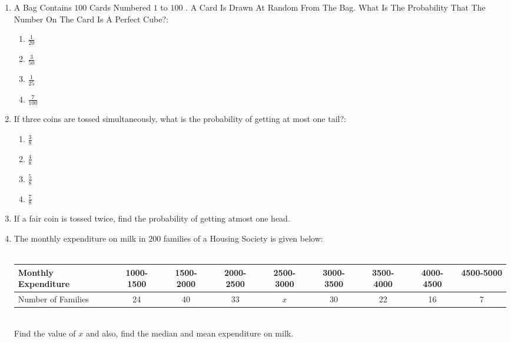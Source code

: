 \begin{enumerate}
\item A Bag Contains $100$ Cards Numbered $1$ to $100$ . A Card Is Drawn At Random From The Bag. What Is The Probability That The Number On The Card Is A Perfect Cube?:    
    \begin{enumerate}
    \item $ \frac{1}{20} $              
    \item $ \frac{3}{50} $                    
    \item $ \frac{1}{25} $                                                
    \item $ \frac{7}{100} $
    \end{enumerate}
    \newpage
    \item If three coins are tossed simultaneously, what is the probability of getting at most one tail?:
    \begin{enumerate}
    \item $ \frac{3}{8} $                              
    \item $ \frac{4}{8} $                            
    \item $ \frac{5}{8} $  
    \item $ \frac{7}{8} $    
    \end{enumerate}
\item
If a fair coin is tossed twice, find the probability of getting atmost one head.

\item
The monthly expenditure on milk in $200$ families of a Housing Society is given below:\\
\\
\footnotesize
\setlength{\tabcolsep}{1pt}
\begin{tabular}{|l|c|c|c|c|c|c|c|c|}
\hline
	Monthly Expenditure \brak{in \rupee} & 1000-1500 & 1500-2000 & 2000-2500 & 2500-3000 & 3000-3500 & 3500-4000 & 4000-4500 & 4500-5000 \\ \hline
Number of Families & 24 & 40 & 33 & $x$ & 30 & 22 & 16 & 7 \\ \hline
\end{tabular}\\

Find the value of $x$ and also, find the median and mean expenditure on milk.

\end{enumerate}
